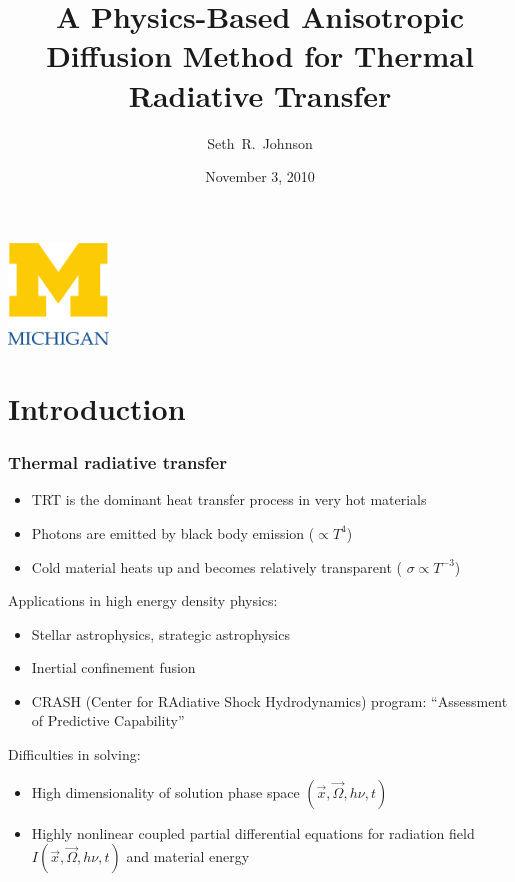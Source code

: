 \documentclass{beamer}
\title[Thesis Prospectus]%
{A Physics-Based Anisotropic Diffusion Method for Thermal Radiative
Transfer}
\author[SRJ]{Seth~R.~Johnson}
\institute[UMich]{
University of Michigan, Ann Arbor
}
\date[11/3/2010]{November 3, 2010}
\begin{document}

\begin{frame}
\titlepage
\begin{center}
  \includegraphics[width=0.2\textwidth]{../figures/umlogo}
\end{center}
\end{frame}

\section{Introduction}
\begin{frame}
  \frametitle{Thermal radiative transfer}
  \begin{itemize}
    \item TRT is the dominant heat transfer process in very hot materials
    \item Photons are emitted by black body emission ($\propto T^4$)
    \item Cold material heats up and becomes relatively transparent (
      $\sigma\propto T^{-3}$)
  \end{itemize}

  Applications in high energy density physics:
  \begin{itemize}
    \item Stellar astrophysics, \textcolor[gray]{.5}{strategic astrophysics}
    \item Inertial confinement fusion
    \item CRASH (Center for RAdiative Shock Hydrodynamics) program: ``Assessment
          of Predictive Capability''
  \end{itemize}
  Difficulties in solving:
  \begin{itemize}
    \item High dimensionality of solution phase space $(\vec{x}, \vec{\Omega},
      h\nu, t)$
    \item Highly nonlinear coupled partial differential equations for radiation
      field $I(\vec{x}, \vec{\Omega}, h\nu, t)$ and material energy
  \end{itemize}
\end{frame}
\end{document}
